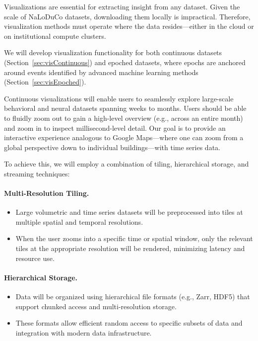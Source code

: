 Visualizations are essential for extracting insight from any dataset.
%
Given the scale of NaLoDuCo datasets, downloading them locally is impractical.
Therefore, visualization methods must operate where the data resides—either in
the cloud or on institutional compute clusters.

We will develop visualization functionality for both continuous datasets
(Section~\ref{sec:visContinuous}) and epoched datasets, where epochs are
anchored around events identified by advanced machine learning methods
(Section~\ref{sec:visEpoched}).

\label{sec:visContinuous}

Continuous visualizations will enable users to seamlessly explore large-scale
behavioral and neural datasets spanning weeks to months. Users should be able
to fluidly zoom out to gain a high-level overview (e.g., across an entire
month) and zoom in to inspect millisecond-level detail. Our goal is to provide
an interactive experience analogous to Google Maps—where one can zoom from a
global perspective down to individual buildings—with time series data.

To achieve this, we will employ a combination of tiling, hierarchical storage,
and streaming techniques:

\paragraph{Multi-Resolution Tiling.}
\begin{itemize}
          \item Large volumetric and time series datasets will be preprocessed
              into tiles at multiple spatial and temporal resolutions.
                \item When the user zooms into a specific time or spatial
                    window, only the relevant tiles at the appropriate
                    resolution will be rendered, minimizing latency and
                    resource use.
\end{itemize}

\paragraph{Hierarchical Storage.}
\begin{itemize}
          \item Data will be organized using hierarchical file formats (e.g.,
              Zarr, HDF5) that support chunked access and multi-resolution
              storage.
                \item These formats allow efficient random access to specific
                    subsets of data and integration with modern data
                    infrastructure.
\end{itemize}

